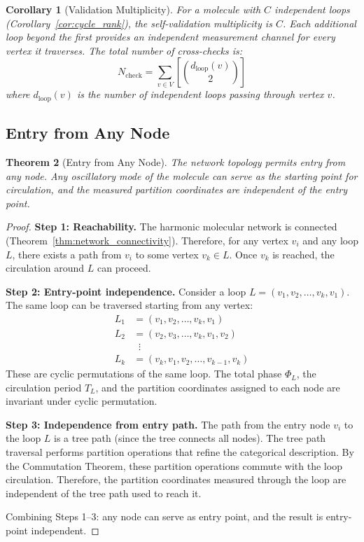 \documentclass[11pt,twocolumn,a4paper]{article}
\newtheorem{theorem}{Theorem}[section]
\newtheorem{corollary}[theorem]{Corollary}
\theoremstyle{definition}
\theoremstyle{remark}
\begin{document}
\begin{corollary}[Validation Multiplicity]
\label{cor:validation_multiplicity}
For a molecule with $C$ independent loops (Corollary~\ref{cor:cycle_rank}), the self-validation multiplicity is $C$. Each additional loop beyond the first provides an independent measurement channel for every vertex it traverses. The total number of cross-checks is:
\begin{equation}
N_{\mathrm{check}} = \sum_{v \in V} \left[ \binom{d_{\mathrm{loop}}(v)}{2} \right]
\end{equation}
where $d_{\mathrm{loop}}(v)$ is the number of independent loops passing through vertex $v$.
\end{corollary}

\subsection{Entry from Any Node}

\begin{theorem}[Entry from Any Node]
\label{thm:entry_any_node}
The network topology permits entry from any node. Any oscillatory mode of the molecule can serve as the starting point for circulation, and the measured partition coordinates are independent of the entry point.
\end{theorem}

\begin{proof}
\textbf{Step 1: Reachability.} The harmonic molecular network is connected (Theorem~\ref{thm:network_connectivity}). Therefore, for any vertex $v_i$ and any loop $L$, there exists a path from $v_i$ to some vertex $v_k \in L$. Once $v_k$ is reached, the circulation around $L$ can proceed.

\textbf{Step 2: Entry-point independence.} Consider a loop $L = (v_1, v_2, \ldots, v_k, v_1)$. The same loop can be traversed starting from any vertex:
\begin{align}
L_1 &= (v_1, v_2, \ldots, v_k, v_1) \\
L_2 &= (v_2, v_3, \ldots, v_k, v_1, v_2) \\
&\;\;\vdots \\
L_k &= (v_k, v_1, v_2, \ldots, v_{k-1}, v_k)
\end{align}
These are cyclic permutations of the same loop. The total phase $\Phi_L$, the circulation period $T_L$, and the partition coordinates assigned to each node are invariant under cyclic permutation.

\textbf{Step 3: Independence from entry path.} The path from the entry node $v_i$ to the loop $L$ is a tree path (since the tree connects all nodes). The tree path traversal performs partition operations that refine the categorical description. By the Commutation Theorem, these partition operations commute with the loop circulation. Therefore, the partition coordinates measured through the loop are independent of the tree path used to reach it.

Combining Steps 1--3: any node can serve as entry point, and the result is entry-point independent.
\end{proof}
\end{document}
